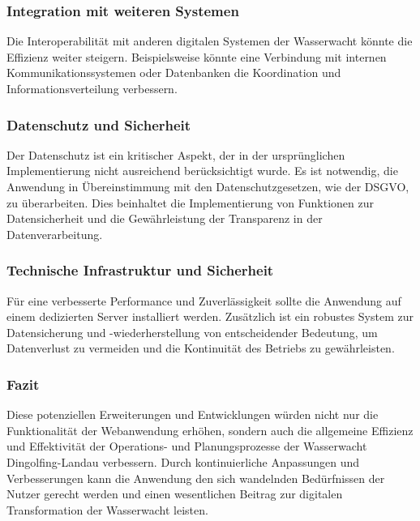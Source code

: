 \documentclass[fontsize=12pt,openright,oneside,paper=a4,BCOR=1cm]{scrbook}
\begin{document}
\subsubsection{Integration mit weiteren Systemen}
Die Interoperabilität mit anderen digitalen Systemen der Wasserwacht könnte die Effizienz weiter steigern. Beispielsweise könnte eine Verbindung mit internen Kommunikationssystemen oder Datenbanken die Koordination und Informationsverteilung verbessern.

\subsubsection{Datenschutz und Sicherheit}
Der Datenschutz ist ein kritischer Aspekt, der in der ursprünglichen Implementierung nicht ausreichend berücksichtigt wurde. Es ist notwendig, die Anwendung in Übereinstimmung mit den Datenschutzgesetzen, wie der DSGVO, zu überarbeiten. Dies beinhaltet die Implementierung von Funktionen zur Datensicherheit und die Gewährleistung der Transparenz in der Datenverarbeitung.

\subsubsection{Technische Infrastruktur und Sicherheit}
Für eine verbesserte Performance und Zuverlässigkeit sollte die Anwendung auf einem dedizierten Server installiert werden. Zusätzlich ist ein robustes System zur Datensicherung und -wiederherstellung von entscheidender Bedeutung, um Datenverlust zu vermeiden und die Kontinuität des Betriebs zu gewährleisten.

\subsubsection{Fazit}
Diese potenziellen Erweiterungen und Entwicklungen würden nicht nur die Funktionalität der Webanwendung erhöhen, sondern auch die allgemeine Effizienz und Effektivität der Operations- und Planungsprozesse der Wasserwacht Dingolfing-Landau verbessern. Durch kontinuierliche Anpassungen und Verbesserungen kann die Anwendung den sich wandelnden Bedürfnissen der Nutzer gerecht werden und einen wesentlichen Beitrag zur digitalen Transformation der Wasserwacht leisten.


%
%

\end{document}
